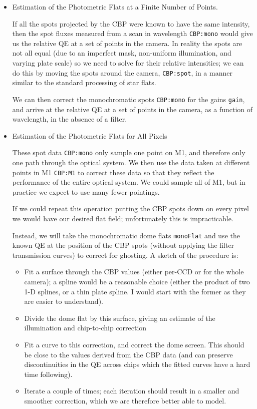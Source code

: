 \documentclass[DM,authoryear,toc,lsstdraft]{lsstdoc}
\newcommand{\inputData}[1]{\texttt{#1}}
\begin{document}
\begin{itemize}
\item Estimation of the Photometric Flats at a Finite Number of Points.

  If all the spots projected by the CBP were known to have the same intensity, then the spot fluxes measured
  from a scan in wavelength \inputData{CBP:mono} would give us the relative QE at a set of points in the
  camera.  In reality the spots are not all equal (due to an imperfect mask, non-uniform illumination, and
  varying plate scale) so we need to solve for their relative intensities; we can do this by moving the spots
  around the camera, \inputData{CBP:spot}, in a manner similar to the standard processing of star flats.

  We can then correct the monochromatic spots \inputData{CBP:mono} for the gains \inputData{gain}, and arrive
  at the relative QE at a set of points in the camera, as a function of wavelength, in the absence of a
  filter.

\item Estimation of the Photometric Flats for All Pixels

  These spot data \inputData{CBP:mono} only sample one point on M1, and therefore only one path
  through the optical system.  We then use the data taken at different points in M1 \inputData{CBP:M1}
  to correct these data so that they reflect the performance of the entire optical system.  We
  could sample all of M1, but in practice we expect to use many fewer pointings.

  If we could repeat this operation putting the CBP spots down on every pixel we would have our
  desired flat field;  unfortunately this is impracticable.

  Instead, we will take the monochromatic dome flats \inputData{monoFlat} and use the known QE at the position
  of the CBP spots (without applying the filter transmission curves) to correct for ghosting.  A sketch
  of the procedure is:
  \begin{itemize}
  \item Fit a surface through the CBP values (either per-CCD or for the whole camera); a spline would
    be a reasonable choice (either the product of two 1-D splines, or a thin plate spline.  I would
    start with the former as they are easier to understand).
  \item Divide the dome flat by this surface, giving an estimate of the illumination and chip-to-chip
    correction
  \item Fit a curve to this correction, and correct the dome screen.  This should be close to the
    values derived from the CBP data (and can preserve discontinuities in the QE across chips which
    the fitted curves have a hard time following).
  \item Iterate a couple of times;  each iteration should result in a smaller and smoother correction,
    which we are therefore better able to model.
  \end{itemize}


\end{itemize}
\end{document}
